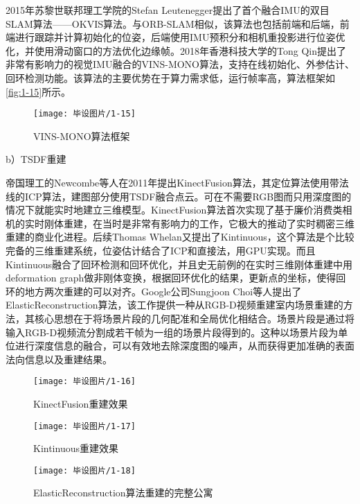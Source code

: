 2015年苏黎世联邦理工学院的Stefan Leutenegger提出了首个融合IMU的双目SLAM算法——OKVIS\cite{OKVIS}算法。与ORB-SLAM相似，该算法也包括前端和后端，前端进行跟踪并计算初始化的位姿，后端使用IMU预积分和相机重投影进行位姿优化，并使用滑动窗口的方法优化边缘帧。2018年香港科技大学的Tong Qin提出了非常有影响力的视觉IMU融合的VINS-MONO\cite{VINSMono}算法，支持在线初始化、外参估计、回环检测功能。该算法的主要优势在于算力需求低，运行帧率高，算法框架如\autoref{fig:1-15}所示。

\begin{figure}[htbp]
    \centering
    \texttt{[image: 毕设图片/1-15]}
    \caption{\label{fig:1-15}VINS-MONO算法框架\cite{VINSMono}}
\end{figure}

b）TSDF重建

帝国理工的Newcombe等人在2011年提出KinectFusion\cite{KinectFusion}算法，其定位算法使用带法线的ICP算法，建图部分使用TSDF融合点云。可在不需要RGB图而只用深度图的情况下就能实时地建立三维模型。KinectFusion算法首次实现了基于廉价消费类相机的实时刚体重建，在当时是非常有影响力的工作，它极大的推动了实时稠密三维重建的商业化进程。后续Thomas Whelan又提出了Kintinuous\cite{Whelan}，这个算法是个比较完备的三维重建系统，位姿估计结合了ICP和直接法，用GPU实现。而且Kintinuous融合了回环检测和回环优化，并且史无前例的在实时三维刚体重建中用deformation graph\cite{Sumner}做非刚体变换，根据回环优化的结果，更新点的坐标，使得回环的地方两次重建的可以对齐。Google公司Sungjoon Choi等人提出了ElasticReconstruction算法\cite{Choi}，该工作提供一种从RGB-D视频重建室内场景重建的方法，其核心思想在于将场景片段的几何配准和全局优化相结合。场景片段是通过将输入RGB-D视频流分割成若干帧为一组的场景片段得到的。这种以场景片段为单位进行深度信息的融合，可以有效地去除深度图的噪声，从而获得更加准确的表面法向信息以及重建结果\cite{Qian-Yi}。

\begin{figure}[htbp]
    \centering
    \texttt{[image: 毕设图片/1-16]}
    \caption{\label{fig:1-16}KinectFusion重建效果\cite{KinectFusion}}
\end{figure}

\begin{figure}[htbp]
    \centering
    \texttt{[image: 毕设图片/1-17]}
    \caption{\label{fig:1-17}Kintinuous重建效果\cite{Whelan}}
\end{figure}

\begin{figure}[htbp]
    \centering
    \texttt{[image: 毕设图片/1-18]}
    \caption{\label{fig:1-18}ElasticReconstruction算法重建的完整公寓\cite{Choi}}
\end{figure}

